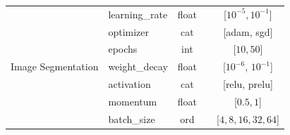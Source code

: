 \documentclass{article}
\newcommand{\cmark}{\ding{51}} %
\newcommand{\xmark}{\ding{55}} %
\begin{document}
\begin{longtable}{@{}p{}lccc@{}}
\multirow{7}{=}{Image Segmentation} & learning\_rate  & float & \textcolor{checkcolor}{\cmark} & [$10^{-5}, 10^{-1}$] \\
                       & optimizer & cat & \textcolor{crosscolor}{\xmark} & [adam, sgd] \\
                       & epochs          & int & \textcolor{crosscolor}{\xmark} & [$10, 50$] \\
                       & weight\_decay      & float  & \textcolor{checkcolor}{\cmark} & [$10^{-6}$, $10^{-1}$] \\
                       & activation            & cat  & \textcolor{crosscolor}{\xmark} & [relu, prelu] \\
                       & momentum            & float  & \textcolor{crosscolor}{\xmark} & [$0.5, 1$] \\ 
                       & batch\_size         & ord & \textcolor{crosscolor}{\xmark} & [$4, 8, 16, 32, 64$] \\


\end{longtable}
\end{document}
